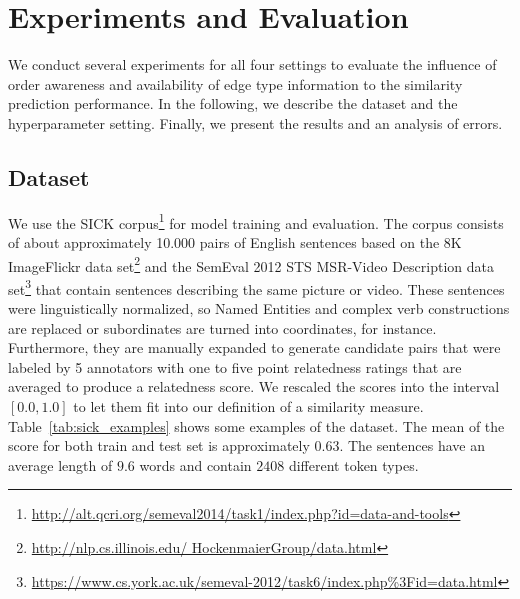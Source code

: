 \section{Experiments and Evaluation}
We conduct several experiments for all four settings to evaluate the influence of order awareness and availability of edge type information to the similarity prediction performance. In the following, we describe the dataset and the hyperparameter setting. Finally, we present the results and an analysis of errors.

\subsection{Dataset}
We use the SICK corpus\footnote{\url{http://alt.qcri.org/semeval2014/task1/index.php?id=data-and-tools}} \autocite{marelli_sick_2014} for model training and evaluation. The corpus consists of about approximately 10.000 pairs of English sentences based on the 8K ImageFlickr data set\footnote{\url{http://nlp.cs.illinois.edu/
HockenmaierGroup/data.html}} \autocite{hodosh_framing_2013} and the SemEval 2012 STS MSR-Video Description data set\footnote{\url{https://www.cs.york.ac.uk/semeval-2012/task6/index.php\%3Fid=data.html}} \autocite{agirre_semeval-2012_2012} that contain sentences describing the same picture or video. These sentences were linguistically normalized, so Named Entities and complex verb constructions are replaced or subordinates are turned into coordinates, for instance. Furthermore, they are manually expanded to generate candidate pairs that were labeled by 5 annotators with one to five point relatedness ratings that are averaged to produce a relatedness score. We rescaled the scores into the interval $[0.0, 1.0]$ to let them fit into our definition of a similarity measure. Table~\ref{tab:sick_examples} shows some examples of the dataset. The mean of the score for both train and test set is approximately $0.63$. The sentences have an average length of $9.6$ words and contain $2408$ different token types.  

